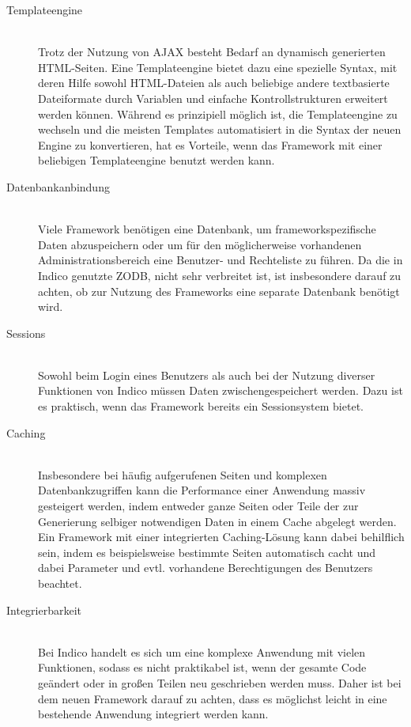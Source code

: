 \begin{description}
\item[Templateengine] \hfill \\
Trotz der Nutzung von AJAX besteht Bedarf an dynamisch generierten HTML-Seiten. Eine Templateengine
bietet dazu eine spezielle Syntax, mit deren Hilfe sowohl HTML-Dateien als auch beliebige andere
textbasierte Dateiformate durch Variablen und einfache Kontrollstrukturen erweitert werden können.
Während es prinzipiell möglich ist, die Templateengine zu wechseln und die meisten Templates
automatisiert in die Syntax der neuen Engine zu konvertieren, hat es Vorteile, wenn das Framework
mit einer beliebigen Templateengine benutzt werden kann.

\item[Datenbankanbindung] \hfill \\
Viele Framework benötigen eine Datenbank, um frameworkspezifische Daten abzuspeichern oder um für
den möglicherweise vorhandenen Administrationsbereich eine Benutzer- und Rechteliste zu führen. Da
die in Indico genutzte ZODB, nicht sehr verbreitet ist, ist insbesondere darauf zu achten, ob zur
Nutzung des Frameworks eine separate Datenbank benötigt wird.

\item[Sessions] \hfill \\
Sowohl beim Login eines Benutzers als auch bei der Nutzung diverser Funktionen von Indico müssen
Daten zwischengespeichert werden. Dazu ist es praktisch, wenn das Framework bereits ein
Sessionsystem bietet.

\item[Caching] \hfill \\
Insbesondere bei häufig aufgerufenen Seiten und komplexen Datenbankzugriffen kann die Performance
einer Anwendung massiv gesteigert werden, indem entweder ganze Seiten oder Teile der zur Generierung
selbiger notwendigen Daten in einem Cache abgelegt werden. Ein Framework mit einer integrierten
Caching-Lösung kann dabei behilflich sein, indem es beispielsweise bestimmte Seiten automatisch
cacht und dabei Parameter und evtl. vorhandene Berechtigungen des Benutzers beachtet.

\item[Integrierbarkeit] \hfill \\
Bei Indico handelt es sich um eine komplexe Anwendung mit vielen Funktionen, sodass es nicht
praktikabel ist, wenn der gesamte Code geändert oder in großen Teilen neu geschrieben werden muss.
Daher ist bei dem neuen Framework darauf zu achten, dass es möglichst leicht in eine bestehende
Anwendung integriert werden kann.


\end{description}
